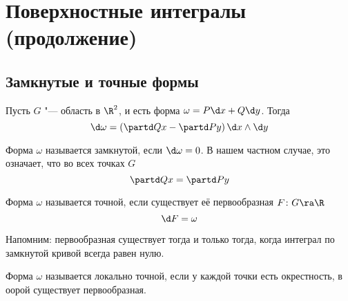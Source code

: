 
\setcounter{chapter}{6}
\chapter{Поверхностные интегралы (продолжение)}
\setcounter{section}{4}
\section{Замкнутые и точные формы}

Пусть $G$ "--- область в $\R^2$, и есть форма $\omega = P \d x + Q \d y$.
Тогда
\[ \d \omega = \left(\partd Qx - \partd Py \right) \d x \wedge \d y \]

\begin{Def}
	Форма $\omega$ называется замкнутой, если $\d \omega = 0$.
	В нашем частном случае, это означает, что во всех точках $G$
	\[ \partd Qx = \partd Py \]
\end{Def}

\begin{Def}
	Форма $\omega$ называется точной, если существует её первообразная $F\colon G \ra \R$
	\[ \d F = \omega \]
\end{Def}

\begin{Rem}
	Напомним: первообразная существует тогда и только тогда, когда интеграл по замкнутой кривой всегда равен нулю.
\end{Rem}

\begin{Def}
	Форма $\omega$ называется локально точной, если у каждой точки есть окрестность, в оорой существует первообразная.
\end{Def}

